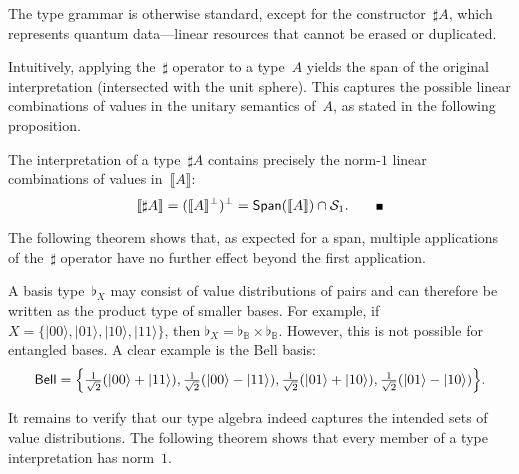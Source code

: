 \documentclass[runningheads,orivec,envcountsame,envcountsect]{llncs}
\providecommand{\qed}{\hbox{\rule{1ex}{1ex}}}%
\newcommand\ket[1]{\ensuremath{|#1\rangle}}
\newcommand\Span[1]{\ensuremath{{\mathsf{Span}}{#1}}}
\def\Sph{\mathcal{S}_1}       %
\def\sem#1{\llbracket#1\rrbracket}
\newcommand\B{\mathbb B}
\newcommand\basis[1]{\ensuremath{\flat_{#1}}}
\begin{document}
The type grammar is otherwise standard, except for the constructor~$\sharp A$,
which represents quantum data---linear resources that cannot be erased or
duplicated.  

Intuitively, applying the~$\sharp$ operator to a type~$A$ yields the span of the
original interpretation (intersected with the unit sphere).  This captures the
possible linear combinations of values in the unitary semantics of~$A$, as
stated in the following proposition.

\begin{theorem}\label{thm:SharpCharacterization}
  The interpretation of a type~$\sharp A$ contains precisely the
  norm-$1$ linear combinations of values in~$\sem{A}$:
  \[
    \sem{\sharp A}
    = (\sem{A}^\bot)^\bot
    = \Span(\sem{A}) \cap \Sph.
    \tag*{\qed}
  \]
\end{theorem}



The following theorem shows that, as expected for a span, multiple
applications of the~$\sharp$ operator have no further effect beyond the first
application.


\begin{remark}
  A basis type~$\basis{X}$ may consist of value distributions of pairs and can
  therefore be written as the product type of smaller bases. For example, if
  $X=\{\ket{00},\ket{01},\ket{10},\ket{11}\}$, then $\basis{X}=\basis{\B}\times\basis{\B}$.
  However, this is not possible for entangled bases. A clear example is the
  Bell basis:
  \[
    \mathsf{Bell}
    =\Bigl\{
      \tfrac{1}{\sqrt{2}}(\ket{00}+\ket{11}),
      \tfrac{1}{\sqrt{2}}(\ket{00}-\ket{11}),
      \tfrac{1}{\sqrt{2}}(\ket{01}+\ket{10}),
      \tfrac{1}{\sqrt{2}}(\ket{01}-\ket{10})
    \Bigr\}.
  \]
\end{remark}

It remains to verify that our type algebra indeed captures the intended sets of
value distributions. The following theorem shows that every member of a type
interpretation has norm~$1$.

\end{document}
